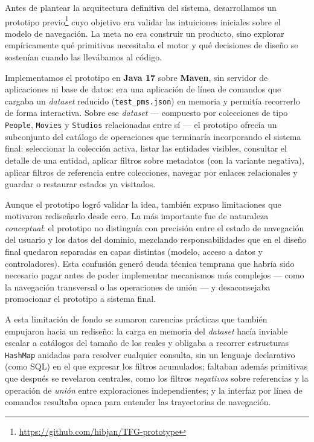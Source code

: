 Antes de plantear la arquitectura definitiva del sistema, desarrollamos un prototipo previo\footnote{\url{https://github.com/hibjan/TFG-prototype}}
cuyo objetivo era validar las intuiciones iniciales sobre el modelo de navegación. La meta no era construir
un producto, sino explorar empíricamente qué primitivas necesitaba el motor y qué decisiones de diseño se
sostenían cuando las llevábamos al código.

Implementamos el prototipo en \textbf{Java 17} sobre \textbf{Maven}, sin servidor de aplicaciones ni base de
datos: era una aplicación de línea de comandos que cargaba un \textit{dataset} reducido (\texttt{test\_pms.json}) en
memoria y permitía recorrerlo de forma interactiva. Sobre ese \textit{dataset} --- compuesto por colecciones de tipo
\texttt{People}, \texttt{Movies} y \texttt{Studios} relacionadas entre sí --- el prototipo ofrecía un
subconjunto del catálogo de operaciones que terminaría incorporando el sistema final: seleccionar la colección
activa, listar las entidades visibles, consultar el detalle de una entidad, aplicar filtros sobre metadatos
(con la variante negativa), aplicar filtros de referencia entre colecciones, navegar por enlaces relacionales
y guardar o restaurar estados ya visitados.

Aunque el prototipo logró validar la idea, también expuso limitaciones que motivaron rediseñarlo desde cero. La
más importante fue de naturaleza \emph{conceptual}: el prototipo no distinguía con precisión entre el estado de
navegación del usuario y los datos del dominio, mezclando responsabilidades que en el diseño final quedaron
separadas en capas distintas (modelo, acceso a datos y controladores). Esta confusión generó deuda técnica
temprana que habría sido necesario pagar antes de poder implementar mecanismos más complejos --- como la
navegación transversal o las operaciones de unión --- y desaconsejaba promocionar el prototipo a sistema final.

A esta limitación de fondo se sumaron carencias prácticas que también empujaron hacia un rediseño: la carga en
memoria del \textit{dataset} hacía inviable escalar a catálogos del tamaño de los reales y obligaba a recorrer estructuras
\texttt{HashMap} anidadas para resolver cualquier consulta, sin un lenguaje declarativo (como SQL) en el que
expresar los filtros acumulados; faltaban además primitivas que después se revelaron centrales, como los filtros
\emph{negativos} sobre referencias y la operación de \emph{unión} entre exploraciones independientes; y la
interfaz por línea de comandos resultaba opaca para entender las trayectorias de navegación.

